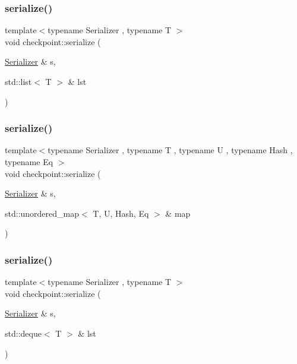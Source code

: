 \subsubsection{\texorpdfstring{serialize()}{serialize()}\hspace{0.1cm}{\footnotesize\ttfamily [21/29]}}
{\footnotesize\ttfamily template$<$typename Serializer , typename T $>$ \\
void checkpoint\+::serialize (\begin{DoxyParamCaption}\item[{\hyperlink{structcheckpoint_1_1_serializer}{Serializer} \&}]{s,  }\item[{std\+::list$<$ T $>$ \&}]{lst }\end{DoxyParamCaption})\hspace{0.3cm}{\ttfamily [inline]}}

\mbox{\label{namespacecheckpoint_a9fc2f3eb20d3ce8d6145e99a2559ea58}} 
\subsubsection{\texorpdfstring{serialize()}{serialize()}\hspace{0.1cm}{\footnotesize\ttfamily [22/29]}}
{\footnotesize\ttfamily template$<$typename Serializer , typename T , typename U , typename Hash , typename Eq $>$ \\
void checkpoint\+::serialize (\begin{DoxyParamCaption}\item[{\hyperlink{structcheckpoint_1_1_serializer}{Serializer} \&}]{s,  }\item[{std\+::unordered\+\_\+map$<$ T, U, Hash, Eq $>$ \&}]{map }\end{DoxyParamCaption})\hspace{0.3cm}{\ttfamily [inline]}}

\mbox{\label{namespacecheckpoint_a179b767294c9b23617f30fc4566d0be7}} 
\subsubsection{\texorpdfstring{serialize()}{serialize()}\hspace{0.1cm}{\footnotesize\ttfamily [23/29]}}
{\footnotesize\ttfamily template$<$typename Serializer , typename T $>$ \\
void checkpoint\+::serialize (\begin{DoxyParamCaption}\item[{\hyperlink{structcheckpoint_1_1_serializer}{Serializer} \&}]{s,  }\item[{std\+::deque$<$ T $>$ \&}]{lst }\end{DoxyParamCaption})\hspace{0.3cm}{\ttfamily [inline]}}

